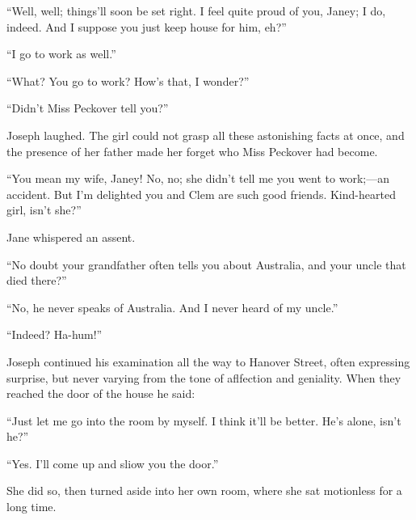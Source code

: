 ``Well, well; things'll soon be set right. I feel quite proud of you,
Janey; I do, indeed. And I suppose you just keep house for him, eh?''

``I go to work as well.''

``What? You go to work? How's that, I wonder?''

``Didn't Miss Peckover tell you?''

Joseph laughed. The girl could not grasp all these astonishing facts at
once, and the presence of her father made her forget who Miss Peckover
had become.

``You mean my wife, Janey! No, no; she didn't tell me you went to
work;---an accident. But I'm delighted you and Clem are such good
friends. Kind-hearted girl, isn't she?''

Jane whispered an assent.

``No doubt your grandfather often tells you about Australia, and your
uncle that died there?''

{}``No, he never speaks of Australia. And I never heard of my uncle.''

``Indeed? Ha-hum!''

Joseph continued his examination all the way to Hanover Street, often
expressing surprise, but never varying from the tone of aflfection and
geniality. When they reached the door of the house he said:

``Just let me go into the room by myself. I think it'll be better. He's
alone, isn't he?''

``Yes. I'll come up and sliow you the door.''

She did so, then turned aside into her own room, where she sat
motionless for a long time.
